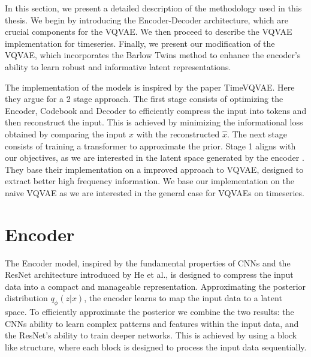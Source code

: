 
In this section, we present a detailed description of the methodology used in this thesis. We begin by introducing the Encoder-Decoder architecture, which are crucial components for the VQVAE. We then proceed to describe the VQVAE implementation for timeseries. Finally, we present our modification of the VQVAE, which incorporates the Barlow Twins method to enhance the encoder's ability to learn robust and informative latent representations.

The implementation of the models is inspired by the paper TimeVQVAE\cite{lee2023masked}. Here they argue for a 2 stage approach. The first stage consists of optimizing the Encoder, Codebook and Decoder to efficiently compress the input into tokens and then reconstruct the input.
This is achieved by minimizing the informational loss obtained by comparing the input $x$ with the reconstructed $\hat{x}$. The next stage consists of training a transformer to approximate the prior.
Stage 1 aligns with our objectives, as we are interested in the latent space generated by the encoder . They base their implementation on a improved approach to VQVAE, designed to extract better high frequency information. We base our implementation on the naive VQVAE as we are interested in the general case for VQVAEs on timeseries.


\section{Encoder}

The Encoder model, inspired by the fundamental properties of CNNs and the ResNet architecture introduced by He et al.\cite{ResLearn}, is designed to compress the input data into a compact and manageable representation.
Approximating the posterior distribution $q_\phi(z|x)$, the encoder learns to map the input data to a latent space. 
To efficiently approximate the posterior we combine the two results: the CNNs ability to learn complex patterns and features within the input data, and the ResNet's ability to train deeper networks. This is achieved by using a block like structure, where each block is designed to process the input data sequentially.

